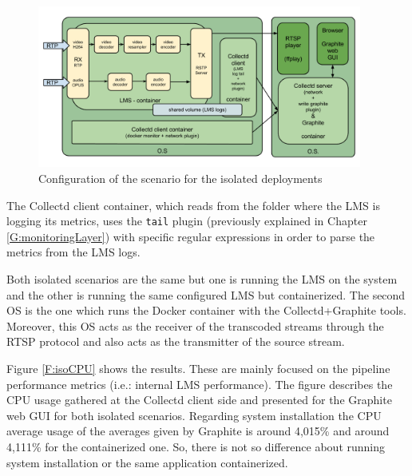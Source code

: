 \begin{figure}[!htb]
\begin{center}
\includegraphics[width=0.95\textwidth]{./images/isolatedScenario.png}
\caption{Configuration of the scenario for the isolated deployments}
\label{F:idsc}
\end{center}
\end{figure}

The Collectd client container, which reads from the folder where the LMS is logging its metrics, uses the \texttt{tail} plugin (previously explained in Chapter \ref{G:monitoringLayer}) with specific regular expressions in order to parse the metrics from the LMS logs.

Both isolated scenarios are the same but one is running the LMS on the system and the other is running the same configured LMS but containerized. The second OS is the one which runs the Docker container with the Collectd+Graphite tools. Moreover, this OS acts as the receiver of the transcoded streams through the RTSP protocol and also acts as the transmitter of the source stream.

Figure \ref{F:isoCPU} shows the results. These are mainly focused on the pipeline performance metrics (i.e.: internal LMS performance). The figure describes the CPU usage gathered at the Collectd client side and presented for the Graphite web GUI for both isolated scenarios. Regarding system installation the CPU average usage of the averages given by Graphite is around 4,015\% and around 4,111\% for the containerized one. So, there is not so difference about running system installation or the same application containerized.


